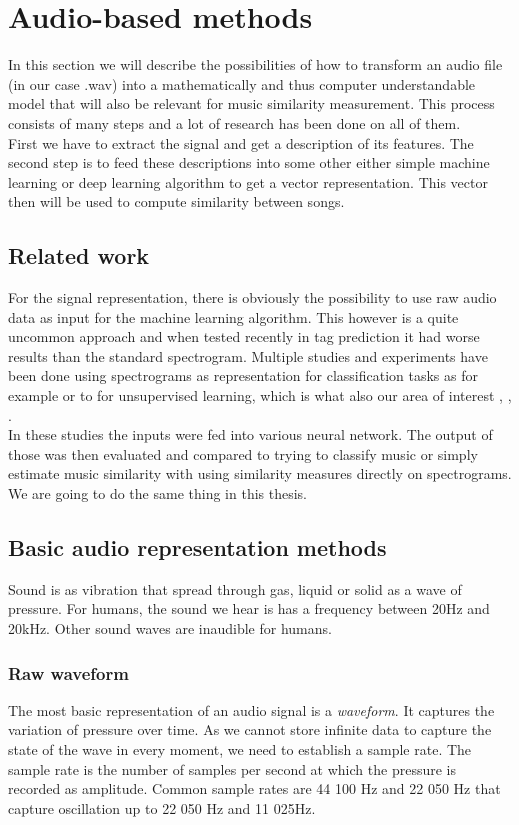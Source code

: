 \chapter{Audio-based methods}
In this section we will describe the possibilities of how to transform an audio file (in our case .wav) into a mathematically and thus computer understandable model that will also be relevant for music similarity measurement. This process consists of many steps and a lot of research has been done on all of them. \\
First we have to extract the signal and get a description of its features. The second step is to feed these descriptions into some other either simple machine learning or deep learning algorithm to get a vector representation. This vector then will be used to compute similarity between songs. \\

\section{Related work}
For the signal representation, there is obviously the possibility to use raw audio data as input for the machine learning algorithm. This however is a quite uncommon approach and when tested recently in tag prediction \cite{6854950} it had worse results than the standard spectrogram. Multiple studies and experiments have been done using spectrograms as representation for classification tasks as for example \cite{wang2014improving} or to for unsupervised learning, which is what also our area of interest \cite{van2013deep}, \cite{Ramakrishnan2017song2V}, \cite{NIPS2009_3674}. \\
In these studies the inputs were fed into various neural network. The output of those was then evaluated and compared to trying to classify music or simply estimate music similarity with using similarity measures directly on spectrograms. We are going to do the same thing in this thesis.
\section{Basic audio representation methods}
Sound is as vibration that spread through gas, liquid or solid as a wave of pressure. For humans, the sound we hear is has a frequency between 20Hz and 20kHz. Other sound waves are inaudible for humans. \\

\subsection{Raw waveform}
The most basic representation of an audio signal is a \textit{waveform}. It captures the variation of pressure over time. As we cannot store infinite data to capture the state of the wave in every moment, we need to establish a sample rate. The sample rate is the number of samples per second at which the pressure is recorded as amplitude. Common sample rates are 44 100 Hz and 22 050 Hz that capture oscillation up to 22 050 Hz and 11 025Hz.
